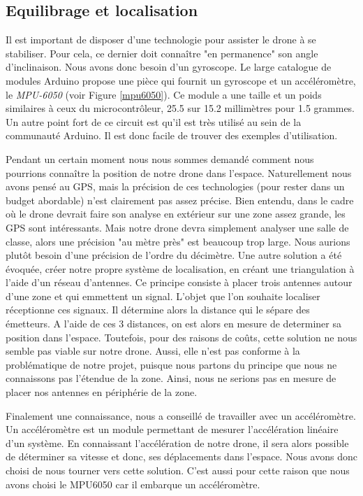 \documentclass[a4paper,10pt]{report}
\begin{document}
      \subsection{Equilibrage et localisation}
	Il est important de disposer d'une technologie pour assister le drone à 
se stabiliser. Pour cela, ce dernier doit connaître "en permanence" son angle 
d'inclinaison. Nous avons donc besoin d'un gyroscope. Le large catalogue de 
modules Arduino propose une pièce qui fournit un gyroscope et un 
accéléromètre, le \textit{MPU-6050} (voir Figure \ref{mpu6050}). Ce module a 
une taille et un poids similaires à ceux du microcontrôleur, 25.5 sur 15.2 
millimètres pour 1.5 grammes. Un autre point fort de ce circuit est qu'il est 
très utilisé au sein de la communauté Arduino. Il est donc facile de trouver 
des exemples d'utilisation.
	
	Pendant un certain moment nous nous sommes demandé comment nous 
pourrions connaître la position de notre drone dans l'espace. Naturellement 
nous avons pensé au GPS, mais la précision de ces technologies (pour rester 
dans 
un budget abordable) n'est clairement pas assez précise. Bien entendu, dans le 
cadre où le drone devrait faire son analyse en extérieur sur une zone assez 
grande, les GPS sont intéressants. Mais notre drone devra simplement analyser 
une salle de classe, alors une précision "au mètre près" est beaucoup trop 
large. Nous aurions plutôt besoin d'une précision de l’ordre du décimètre.  Une 
autre solution a été évoquée, créer notre propre système de localisation, en 
créant une triangulation\cite{triangulation} à l’aide d’un réseau d’antennes. 
Ce principe consiste à placer trois antennes autour d'une zone et qui emmettent 
un signal.
L'objet que l'on souhaite localiser réceptionne ces signaux. Il détermine alors 
la distance
 qui le sépare des émetteurs. A l'aide de ces 3 distances, on  est alors en 
mesure de determiner
 sa position dans l'espace. Toutefois, pour des raisons de coûts, cette solution 
ne nous 
semble pas viable sur notre drone. Aussi, elle n'est pas conforme à la 
problématique de notre projet, puisque nous partons du principe que nous ne 
connaissons pas l'étendue de la zone. Ainsi, nous ne serions pas en mesure de 
placer nos antennes en périphérie de la zone.


	Finalement une connaissance, nous a conseillé de travailler avec un 
accéléromètre. Un accéléromètre est un module permettant de mesurer 
l'accélération linéaire d’un système. En connaissant l'accélération de notre 
drone, il sera alors possible de déterminer sa vitesse et donc, ses 
déplacements 
dans l’espace. Nous avons donc choisi de nous tourner vers cette solution. 
C'est aussi pour cette raison que nous avons choisi le MPU6050 car il embarque 
un accéléromètre.
	
\end{document}

